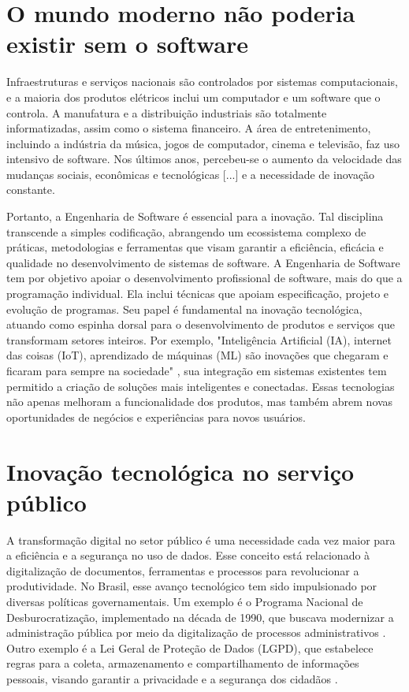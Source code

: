 \documentclass[12pt,oneside,a4paper,article]{abntex2}
\begin{document}
\section{O mundo moderno não poderia existir sem o software}
Infraestruturas e serviços nacionais são controlados por sistemas computacionais, e a maioria dos produtos elétricos inclui um computador e um software que o controla. A manufatura e a distribuição industriais são totalmente informatizadas, assim como o sistema financeiro. A área de entretenimento, incluindo a indústria da música, jogos de computador, cinema e televisão, faz uso intensivo de software. Nos últimos anos, percebeu-se o aumento da velocidade das mudanças sociais, econômicas e tecnológicas [...] e a necessidade de inovação constante.\cite{albertin2021transformaccao}

Portanto, a Engenharia de Software é essencial para a inovação. Tal disciplina transcende a simples codificação, abrangendo um ecossistema complexo de práticas, metodologias e ferramentas que visam garantir a eficiência, eficácia e qualidade no desenvolvimento de sistemas de software. A Engenharia de Software tem por objetivo apoiar o desenvolvimento profissional de software, mais do que a programação individual. Ela inclui técnicas que apoiam especificação, projeto e evolução de programas. Seu papel é fundamental na inovação tecnológica, atuando como espinha dorsal para o desenvolvimento de produtos e serviços que transformam setores inteiros. Por exemplo, "Inteligência Artificial (IA), internet das coisas (IoT), aprendizado de máquinas (ML) são inovações que chegaram e ficaram para sempre na sociedade" \cite{marques2023ciencia}, sua integração em sistemas existentes tem permitido a criação de soluções mais inteligentes e conectadas. Essas tecnologias não apenas melhoram a funcionalidade dos produtos, mas também abrem novas oportunidades de negócios e experiências para novos usuários.

\section{Inovação tecnológica no serviço público}
A transformação digital no setor público é uma necessidade cada vez maior para a eficiência e a segurança no uso de dados. Esse conceito está relacionado à digitalização de documentos, ferramentas e processos para revolucionar a produtividade. No Brasil, esse avanço tecnológico tem sido impulsionado por diversas políticas governamentais. Um exemplo é o Programa Nacional de Desburocratização, implementado na década de 1990, que buscava modernizar a administração pública por meio da digitalização de processos administrativos \cite{grin2015programa}. Outro exemplo é a Lei Geral de Proteção de Dados (LGPD), que estabelece regras para a coleta, armazenamento e compartilhamento de informações pessoais, visando garantir a privacidade e a segurança dos cidadãos .
\end{document}
